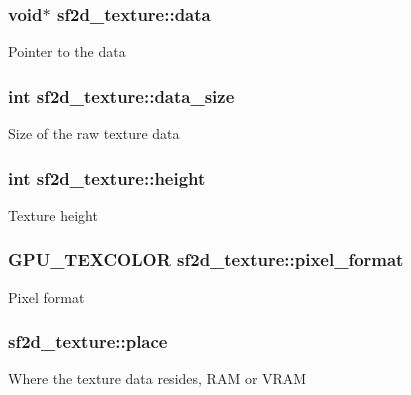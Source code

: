 \subsubsection[{data}]{\setlength{\rightskip}{0pt plus 5cm}void$\ast$ sf2d\+\_\+texture\+::data}\label{structsf2d__texture_a46673c7ce439c63554a23e6ce83b254f}
Pointer to the data \hypertarget{structsf2d__texture_a99107fa90e683bab6456da738ff9d005}{}
\subsubsection[{data\+\_\+size}]{\setlength{\rightskip}{0pt plus 5cm}int sf2d\+\_\+texture\+::data\+\_\+size}\label{structsf2d__texture_a99107fa90e683bab6456da738ff9d005}
Size of the raw texture data \hypertarget{structsf2d__texture_a055ccacd41038339dd1ded72747ccf8f}{}
\subsubsection[{height}]{\setlength{\rightskip}{0pt plus 5cm}int sf2d\+\_\+texture\+::height}\label{structsf2d__texture_a055ccacd41038339dd1ded72747ccf8f}
Texture height \hypertarget{structsf2d__texture_a247bd65d7ab9db17fdd8bd78b17cba23}{}
\subsubsection[{pixel\+\_\+format}]{\setlength{\rightskip}{0pt plus 5cm}G\+P\+U\+\_\+\+T\+E\+X\+C\+O\+L\+O\+R sf2d\+\_\+texture\+::pixel\+\_\+format}\label{structsf2d__texture_a247bd65d7ab9db17fdd8bd78b17cba23}
Pixel format \hypertarget{structsf2d__texture_ac30cfc2de337739d1a19858e4fdacaa4}{}
\subsubsection[{place}]{ sf2d\+\_\+texture\+::place}\label{structsf2d__texture_ac30cfc2de337739d1a19858e4fdacaa4}
Where the texture data resides, R\+A\+M or V\+R\+A\+M \hypertarget{structsf2d__texture_a644c43b5fde6e12c8f1e3cb0280798e1}{}
